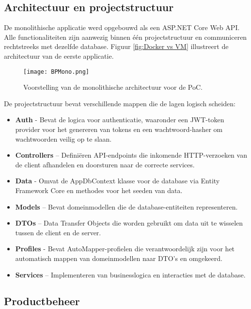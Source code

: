\subsection{Architectuur en projectstructuur}

De monolithische applicatie werd opgebouwd als een ASP.NET Core Web API. Alle functionaliteiten zijn aanwezig binnen één projectstructuur en communiceren rechtstreeks met dezelfde database. Figuur \ref{fig:Docker vs VM} illustreert de architectuur van de eerste applicatie.

\begin{figure}[H]
	\centering
	\texttt{[image: BPMono.png]}
	\caption[Voorstelling van de monolithische architectuur voor de PoC.]{\label{fig:BPMono}Voorstelling van de monolithische architectuur voor de PoC.\linebreak}
\end{figure}

De projectstructuur bevat verschillende mappen die de lagen logisch scheiden:

\begin{itemize}
	\item \textbf{Auth} - Bevat de logica voor authenticatie, waaronder een JWT-token provider voor het genereren van tokens en een wachtwoord-hasher om wachtwoorden veilig op te slaan.
	\item \textbf{Controllers} – Definiëren API-endpoints die inkomende HTTP-verzoeken van de client afhandelen en doorsturen naar de correcte services.
	\item \textbf{Data} - Omvat de AppDbContext klasse voor de database via Entity Framework Core en methodes voor het seeden van data.
	\item \textbf{Models} – Bevat domeinmodellen die de database-entiteiten representeren.
	\item \textbf{DTOs} – Data Transfer Objects die worden gebruikt om data uit te wisselen tussen de client en de server. 
	\item \textbf{Profiles} - Bevat AutoMapper-profielen die verantwoordelijk zijn voor het automatisch mappen van domeinmodellen naar DTO's en omgekeerd.
	\item \textbf{Services} – Implementeren van businesslogica en interacties met de database.
\end{itemize}

\subsection{Productbeheer}

